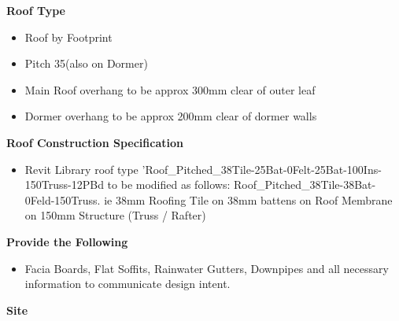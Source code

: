 \textbf{Roof Type}
\begin{itemize}
	\item Roof by Footprint
	\item Pitch 35\degree (also on Dormer)
	\item Main Roof overhang to be approx 300mm clear of outer leaf
	\item Dormer overhang to be approx 200mm clear of dormer walls
\end{itemize}



\textbf{Roof Construction Specification}
\begin{itemize}
	\item Revit Library roof type 'Roof\_Pitched\_38Tile-25Bat-0Felt-25Bat-100Ins-150Truss-12PBd to be modified as follows: Roof\_Pitched\_38Tile-38Bat-0Feld-150Truss. ie 38mm Roofing Tile on 38mm battens on Roof Membrane on 150mm Structure (Truss / Rafter)
\end{itemize}




\textbf{Provide the Following}
\begin{itemize}
	\item Facia Boards, Flat Soffits, Rainwater Gutters, Downpipes and all necessary information to communicate design intent.
\end{itemize}





\textbf{Site}












